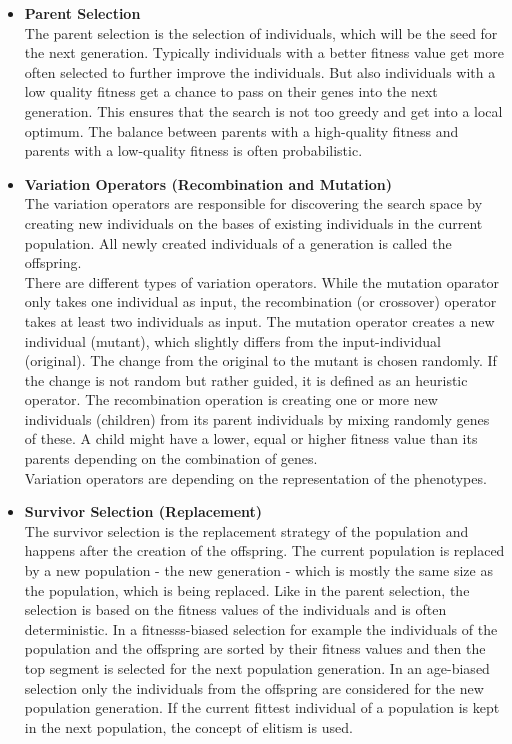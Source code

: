 \begin{itemize}
        \item \textbf{Parent Selection}\\
        The parent selection is the selection of individuals, which will be the seed for the next generation. Typically individuals with a better fitness value get more often selected to further improve the individuals. But also individuals with a low quality fitness get a chance to pass on their genes into the next generation. This ensures that the search is not too greedy and get into a local optimum. The balance between parents with a high-quality fitness and parents with a low-quality fitness is often probabilistic.
           
        \item \textbf{Variation Operators (Recombination and Mutation)}\\
        The variation operators are responsible for discovering the search space by creating new individuals on the bases of existing individuals in the current population. All newly created individuals of a generation is called the offspring.\\
        There are different types of variation operators. While the mutation oparator only takes one individual as input, the recombination (or crossover) operator takes at least two individuals as input. The mutation operator creates a new individual (mutant), which slightly differs from the input-individual (original). The change from the original to the mutant is chosen randomly. If the change is not random but rather guided, it is defined as an heuristic operator. The recombination operation is creating one or more new individuals (children) from its parent individuals by mixing randomly genes of these. A child might have a lower, equal or higher fitness value than its parents depending on the combination of genes.\\
        Variation operators are depending on the representation of the phenotypes.
        
        \item \textbf{Survivor Selection (Replacement)}\\
        The survivor selection is the replacement strategy of the population and happens after the creation of the offspring. The current population is replaced by a new population - the new generation - which is mostly the same size as the population, which is being replaced. Like in the parent selection, the selection is based on the fitness values of the individuals and is often deterministic. In a fitnesss-biased selection for example the individuals of the population and the offspring are sorted by their fitness values and then the top segment is selected for the next population generation. In an age-biased selection only the individuals from the offspring are considered for the new population generation. If the current fittest individual of a population is kept in the next population, the concept of elitism is used.
        

\end{itemize}
